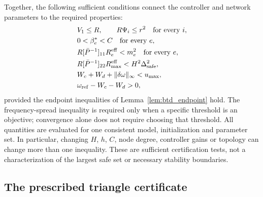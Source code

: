 Together, the following sufficient conditions connect the controller
and network parameters to the required properties:
\begin{align}
 &V_1\le R,\qquad R\Psi_i\le r^2\quad\text{for every }i,\nonumber\\
 &0<\beta_e^*<C\quad\text{for every }e,\nonumber\\
 &R[\bar P^{-1}]_{11}R_e^{\rm eff}<m_e^2
       \quad\text{for every }e,\nonumber\\
 &R[\bar P^{-1}]_{22}R_{\max}^{\rm eff}
       <H^2\Delta_{\rm safe}^2,\nonumber\\
 &W_c+W_d+\|\delta\omega\|_\infty<u_{\max},\nonumber\\
 &\omega_{\rm ref}-W_c-W_d>0,
 \label{eq:btd_joint_sufficient_conditions}
\end{align}
provided the endpoint inequalities of Lemma~\ref{lem:btd_endpoint} hold.
The frequency-spread inequality is required only when a specific threshold
is an objective; convergence alone does not require choosing that threshold.
All quantities are evaluated for one consistent model, initialization
and parameter set. In particular, changing $H$, $h$, $C$, node degree,
controller gains or topology can change more than one inequality.
These are sufficient certification tests, not a characterization of the
largest safe set or necessary stability boundaries.

\subsection{The prescribed triangle certificate}

